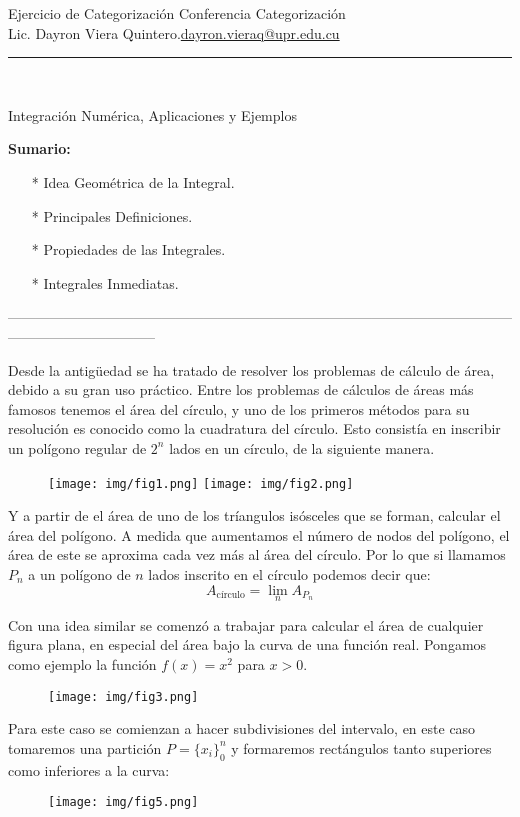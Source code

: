\documentclass{article}
\begin{document}
{{\huge\color{uprgreen} Ejercicio de Categorización}\hfill{\color{uprgreen} Conferencia Categorización}}\\
{\color{uprgreen} Lic. Dayron Viera Quintero.\hfill \href{mailto:dayron.vieraq@upr.edu.cu}{dayron.vieraq@upr.edu.cu}}
{\color{uprgreen} \hrule}
\text{\ \ }
\\
\begin{center}
	\Large\color{uprgreen} Integración Numérica, Aplicaciones y Ejemplos
\end{center}
{\Large\bf\color{uprgreen} Sumario:}
\begin{itemize}
	\item[\color{uprgreen}*] Idea Geométrica de la Integral.
	\item[\color{uprgreen}*] Principales Definiciones.
	\item[\color{uprgreen}*] Propiedades de las Integrales.
	\item[\color{uprgreen}*] Integrales Inmediatas.
\end{itemize}
\begin{center}
	{\color{uprgreen}--------------------------------------------------------------------------------------------------------------------------------------------}
\end{center}

Desde la antigüedad se ha tratado de resolver los problemas de cálculo de área, debido a su gran uso práctico. Entre los problemas de cálculos de áreas más famosos tenemos el área del círculo, y uno de los primeros métodos para su resolución es conocido como la cuadratura del círculo. Esto consistía en inscribir un polígono regular de $2^n$ lados en un círculo, de la siguiente manera.

\begin{figure}[h!]
	\centering
	\texttt{[image: img/fig1.png]}
	\texttt{[image: img/fig2.png]}
	\label{fig:1}
\end{figure}

Y a partir de el área de uno de los tríangulos isósceles que se forman, calcular el área del polígono. A medida que aumentamos el número de nodos del polígono, el área de este se aproxima cada vez más al área del círculo. Por lo que si llamamos $P_n$ a un polígono de $n$ lados inscrito en el círculo podemos decir que:
$$A_{\text{círculo}}=\lim_n A_{P_n} $$

Con una idea similar se comenzó a trabajar para calcular el área de cualquier figura plana, en especial del área bajo la curva de una función real. Pongamos como ejemplo la función $f(x)=x^2$ para $x>0$.
\begin{figure}[h!]
	\centering
	\texttt{[image: img/fig3.png]}
	\label{fig:2}
\end{figure}
\newpage
Para este caso se comienzan a hacer subdivisiones del intervalo, en este caso tomaremos una partición $\displaystyle P=\{x_i\}_0^{n}$ y formaremos rectángulos tanto superiores como inferiores a la curva:
\begin{figure}[h!]
	\centering
	\texttt{[image: img/fig5.png]}
\end{figure}
\end{document}
